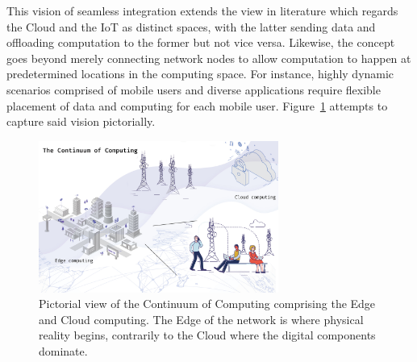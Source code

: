 This vision of seamless integration extends the view in literature which regards the Cloud and the IoT as distinct spaces, with the latter sending data and offloading computation to the former but not vice versa. Likewise, the concept goes beyond merely connecting network nodes to allow computation to happen at predetermined locations in the computing space. For instance, highly dynamic scenarios comprised of mobile users and diverse applications require flexible placement of data and computing for each mobile user. Figure~\ref{fig:continuum} attempts to capture said vision pictorially. 

\begin{figure}[ht]
\centering
\includegraphics[width=0.7\textwidth]{figures/continuum}
\caption{Pictorial view of the Continuum of Computing comprising the Edge and Cloud computing. The Edge of the network is where physical reality begins, contrarily to the Cloud where the digital components dominate.}
\label{fig:continuum}
\end{figure}


